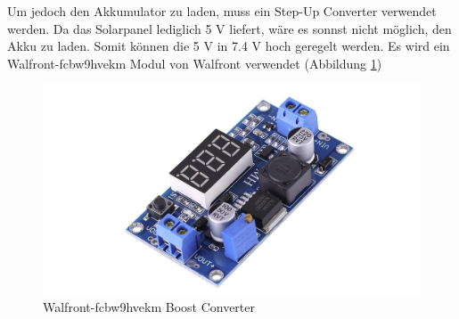 Um jedoch den Akkumulator zu laden, muss ein Step-Up Converter verwendet werden. Da das Solarpanel lediglich 5 V liefert, wäre es sonnst nicht möglich, den Akku zu laden. Somit können die 5 V in 7.4 V hoch geregelt werden. Es wird ein Walfront-fcbw9hvekm Modul von Walfront verwendet (Abbildung \ref{fig:walfront})


\begin{figure}
    \centering
    \includegraphics[width=0.5\linewidth]{assets/imagestep_up.png}
    \caption{Walfront-fcbw9hvekm Boost Converter}
    \label{fig:walfront}
    
\end{figure}